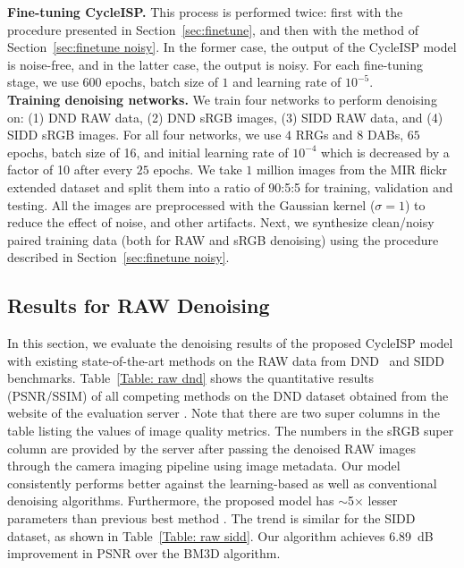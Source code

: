 \documentclass[10pt,twocolumn,letterpaper]{article}
\begin{document}
\vspace{0.4em}
\noindent \textbf{Fine-tuning CycleISP.} This process is performed twice: first with the procedure presented in Section~\ref{sec:finetune}, and then with the method of Section~\ref{sec:finetune noisy}. 
In the former case, the output of the CycleISP model is noise-free, and in the latter case, the output is noisy. 
For each fine-tuning stage, we use $600$ epochs, batch size of $1$ and learning rate of $10^{-5}$.  
\vspace{0.4em}\\
\noindent \textbf{Training denoising networks.} We train four networks to perform denoising on: (1) DND RAW data, (2) DND sRGB images, (3) SIDD RAW data, and (4) SIDD sRGB images. 
For all four networks, we use $4$ RRGs and $8$ DABs, $65$ epochs, batch size of 16, and initial learning rate of $10^{-4}$ which is decreased by a factor of 10 after every $25$ epochs.  
We take $1$ million images from the MIR flickr extended dataset \cite{flickr} and split them into a ratio of 90:5:5 for training, validation and testing. 
All the images are preprocessed with the Gaussian kernel ($\sigma =1$) to reduce the effect of noise, and other artifacts. 
Next, we synthesize clean/noisy paired training data (both for RAW and sRGB denoising) using the procedure described in Section~\ref{sec:finetune noisy}.

\subsection{Results for RAW Denoising}
In this section, we evaluate the denoising results of the proposed CycleISP model with existing state-of-the-art methods on the RAW data from DND~\cite{dnd} and SIDD~\cite{sidd} benchmarks. 
Table~\ref{Table: raw dnd} shows the quantitative results (PSNR/SSIM) of all competing methods on the DND dataset
obtained from the website of the evaluation server \cite{dndwebsite}. 
Note that  there are two super columns in the table listing the values of image quality metrics. 
The numbers in the sRGB super column are provided by the server after passing the denoised RAW images through the camera imaging pipeline \cite{karaimer2016software} using image metadata. 
Our model consistently performs  
better against the learning-based as well as conventional denoising algorithms.
Furthermore, the proposed model has $\sim$5$\times$ lesser parameters than previous best method \cite{Brooks2019}.
The trend is similar for the SIDD dataset, as shown in Table~\ref{Table: raw sidd}. Our algorithm achieves 6.89~dB improvement in PSNR over the BM3D algorithm\cite{BM3D}.   
\end{document}
